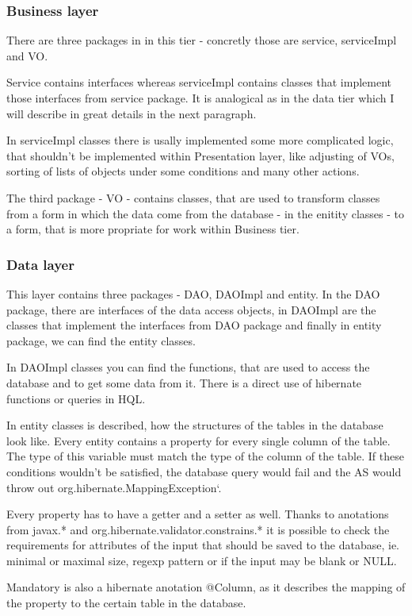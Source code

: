 \documentclass[thesis=B,english]{FITthesis}[2012/10/20]
\begin{document}
\subsubsection{Business layer}
There are three packages in in this tier - concretly those are service, serviceImpl and VO. 

Service contains interfaces whereas serviceImpl contains classes that implement those interfaces from service package. It is analogical as in the data tier which I will describe in great details in the next paragraph.

In serviceImpl classes there is usally implemented some more complicated logic, that shouldn't be implemented within Presentation layer, like adjusting of VOs, sorting of lists of objects under some conditions and many other actions.

The third package - VO - contains classes, that are used to transform classes from a form in which the data come from the database - in the enitity classes - to a form, that is more propriate for work within Business tier.
\subsubsection{Data layer}
This layer contains three packages - DAO, DAOImpl and entity. In the DAO package, there are interfaces of the data access objects, in DAOImpl are the classes that implement the interfaces from DAO package and finally in entity package, we can find the entity classes.

In DAOImpl classes you can find the functions, that are used to access the database and to get some data from it. There is a direct use of hibernate functions or queries in HQL.

In entity classes is described, how the structures of the tables in the database look like. Every entity contains a property for every single column of the table. The type of this variable must match the type of the column of the table. If these conditions wouldn't be satisfied, the database query would fail and the AS would throw out org.hibernate.MappingException`.

Every property has to have a getter and a setter as well. Thanks to anotations from javax.* and org.hibernate.validator.constrains.* it is possible to check the requirements for attributes of the input that should be saved to the database, ie. minimal or maximal size, regexp pattern or if the input may be blank or NULL.

Mandatory is also a hibernate anotation @Column, as it describes the mapping of the property to the certain table in the database.
\end{document}
